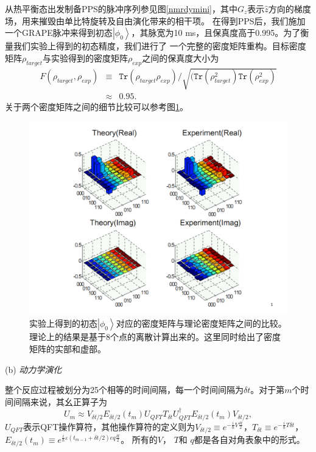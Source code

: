 从热平衡态出发制备PPS的脉冲序列参见图\ref{nmrdymini}，其中$G_z$表示$\hat{z}$方向的梯度场，用来摧毁由单比特旋转及自由演化带来的相干项。
在得到PPS后，我们施加一个GRAPE脉冲来得到初态$\left\vert \phi_{0} \right\rangle$，其脉宽为10 ms，且保真度高于0.995。为了衡量我们实验上得到的初态精度，我们进行了
一个完整的密度矩阵重构。目标密度矩阵$\rho_{target}$与实验得到的密度矩阵$\rho_{exp}$之间的保真度大小为
\begin{eqnarray}
F(\rho_{target}, \rho_{exp})&\equiv& \texttt{Tr}(\rho_{target}\rho_{exp})/\sqrt{(\texttt{Tr}(\rho_{target}^2)\texttt{Tr}(\rho_{exp}^2)} \nonumber \\
&\approx & 0.95.
\end{eqnarray}
关于两个密度矩阵之间的细节比较可以参考图\ref{nmrdyminiden}。

 \begin{figure}[htbp]
            \begin{center}
              \includegraphics[width= 0.8\columnwidth]{figures/nmrdyminiden.pdf}
              \caption{实验上得到的初态$\left\vert \phi_{0} \right\rangle$对应的密度矩阵与理论密度矩阵之间的比较。理论上的结果是基于8个点的离散计算出来的。这里同时给出了密度矩阵的实部和虚部。}\label{nmrdyminiden}
            \end{center}
 \end{figure}

 (b) \emph{动力学演化}

整个反应过程被划分为25个相等的时间间隔，每一个时间间隔为$\delta t$。对于第$m$个时间间隔来说，其幺正算子为
\begin{equation}
U_m\approx V_{\delta t/2}{E}_{\delta t/2}(t_m)U_{QFT}T_{\delta t}U_{QFT}^{\dagger}{E}_{\delta t/2}(t_{m}){V}_{\delta t/2},
\end{equation}
$U_{QFT}$表示QFT操作算符，其他操作算符的定义则为${V}_{\delta t/2}\equiv e^{-\frac{i}{\hbar}{V}\frac{\delta t}{2}}$，${T}_{\delta t} \equiv e^{-\frac{i}{\hbar}{T}\delta t}$， ${E}_{\delta t/2}(t_m)\equiv e^{\frac{i}{\hbar}\varepsilon(t_{m-1}+\delta t/2) e q\frac{\delta t}{2}}$。
所有的$V$， $T$和 $q$都是各自对角表象中的形式。


